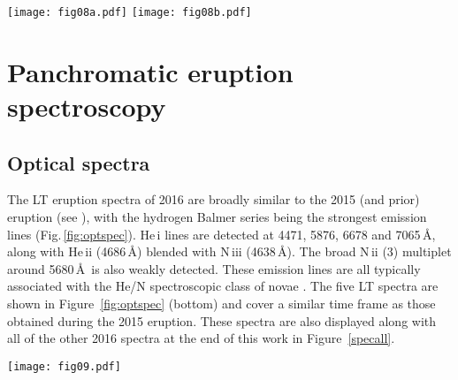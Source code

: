 \documentclass[twocolumn,tighten]{aastex6}
\def\xmm{{\it XMM-Newton~}}
\def\novak{{M31N\,2008-12a}}
\newcommand{\othreek}{\citetalias{2016ApJ...833..149D}}
\begin{document}
\begin{figure*}
\texttt{[image: fig08a.pdf]}\hfill
\texttt{[image: fig08b.pdf]}
\caption{\xmm EPIC light curves for observations 0784000101 (day 14.21; left) and 0784000201 (day 15.80; right) with 2\,ks binning. The EPIC pn (black), MOS1 (red), and MOS2 (blue) count rates and corresponding uncertainties are color-coded. The solid lines with the same colours are smoothed fits via locally-weighted polynomial regression (LOWESS).}
\label{fig:epic_lc}
\end{figure*}

\section{Panchromatic eruption spectroscopy}
\label{sec:spec}

\subsection{Optical spectra}
\label{sec:vis_spec}

The LT eruption spectra of 2016 are broadly similar to the 2015 (and prior) eruption (see \othreek),  with the hydrogen Balmer series being the strongest emission lines (Fig.\,\ref{fig:optspec}). He\,{\sc i} lines are detected at 4471, 5876, 6678 and 7065\,\AA, along with He\,{\sc ii} (4686\,\AA) blended with N\,{\sc iii} (4638\,\AA).  The broad N\,{\sc ii} (3)  multiplet around 5680\,\AA\ is also weakly detected. These emission lines are all typically associated with the He/N spectroscopic class of novae \citep{1992AJ....104..725W}. The five LT spectra are shown in Figure~\ref{fig:optspec} (bottom) and cover a similar time frame as those obtained during the 2015 eruption. These spectra are also displayed along with all of the other 2016 spectra at the end of this work in Figure~\ref{specall}.

\begin{figure*}
\texttt{[image: fig09.pdf]}
\caption{{\bf Top:} NOT ALFOSC spectrum of \novak, taken 0.54\,days after the 2016 eruption, one of  the earliest spectra taken of any of the \novak\ eruptions. The gray dashed lines represent a velocity of $-6250$\,km\,s$^{-1}$ with respect the H$\beta$, He\,{\sc i} 5876\,\AA\ and H$\alpha$. Narrow absorption can be seen at this velocity accompanying the H$\alpha$ and H$\beta$ emission lines, and there is evidence for a similar absorption feature with He\,{\sc i} 5876\,\AA.\label{fig:not} {\bf Bottom:} LT spectra of the 2016 eruption, taken between 0.61 and 4.52\,days after eruption.\label{fig:optspec}}
\end{figure*}
\end{document}
